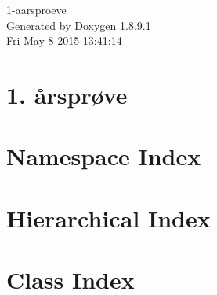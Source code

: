 \documentclass[twoside]{book}
\newcommand{\+}{\discretionary{\mbox{\scriptsize$\hookleftarrow$}}{}{}}
\newcommand{\clearemptydoublepage}{%
  \newpage{\pagestyle{empty}\cleardoublepage}%
}
\begin{document}
\hypersetup{pageanchor=false,
             bookmarks=true,
             bookmarksnumbered=true,
             pdfencoding=unicode
            }
\begin{titlepage}
\vspace*{7cm}
\begin{center}%
{\Large 1-\/aarsproeve }\\
\vspace*{1cm}
{\large Generated by Doxygen 1.8.9.1}\\
\vspace*{0.5cm}
{\small Fri May 8 2015 13:41:14}\\
\end{center}
\end{titlepage}
\clearemptydoublepage
\tableofcontents
\clearemptydoublepage
{}
\hypersetup{pageanchor=true}

\chapter{1. årsprøve}
\label{md__documents__git_hub_1-aarsproeve__r_e_a_d_m_e}
\hypertarget{md__documents__git_hub_1-aarsproeve__r_e_a_d_m_e}{}

\chapter{Namespace Index}

\chapter{Hierarchical Index}

\chapter{Class Index}

\end{document}
